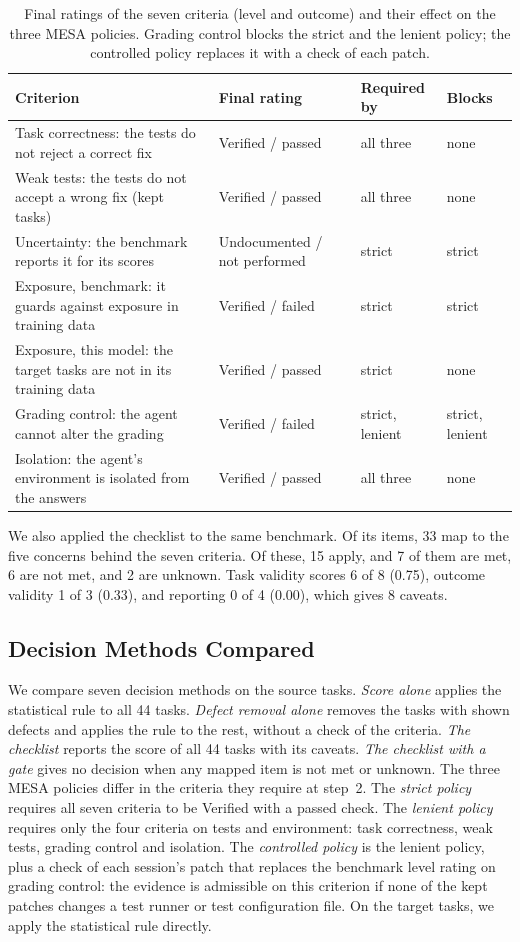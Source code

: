 \documentclass[runningheads]{llncs}
\begin{document}
\begin{table}[t]
\centering
\caption{Final ratings of the seven criteria (level and outcome) and their effect on the three MESA policies. Grading control blocks the strict and the lenient policy; the controlled policy replaces it with a check of each patch.}
\label{tab:ratings}
\footnotesize
\begin{tabularx}{\textwidth}{@{}YL{2.5cm}L{2.2cm}L{1.7cm}@{}}
\toprule
Criterion & Final rating & Required by & Blocks \\
\midrule
Task correctness: the tests do not reject a correct fix & Verified / passed & all three & none \\
Weak tests: the tests do not accept a wrong fix (kept tasks) & Verified / passed & all three & none \\
Uncertainty: the benchmark reports it for its scores & Undocumented / not performed & strict & strict \\
Exposure, benchmark: it guards against exposure in training data & Verified / failed & strict & strict \\
Exposure, this model: the target tasks are not in its training data & Verified / passed & strict & none \\
Grading control: the agent cannot alter the grading & Verified / failed & strict, lenient & strict, lenient \\
Isolation: the agent's environment is isolated from the answers & Verified / passed & all three & none \\
\bottomrule
\end{tabularx}
\end{table}

We also applied the checklist to the same benchmark. Of its items, 33 map to the five concerns behind the seven criteria. Of these, 15 apply, and 7 of them are met, 6 are not met, and 2 are unknown. Task validity scores 6 of 8 (0.75), outcome validity 1 of 3 (0.33), and reporting 0 of 4 (0.00), which gives 8 caveats.

\subsection{Decision Methods Compared}
We compare seven decision methods on the source tasks. \emph{Score alone} applies the statistical rule to all 44 tasks. \emph{Defect removal alone} removes the tasks with shown defects and applies the rule to the rest, without a check of the criteria. \emph{The checklist} reports the score of all 44 tasks with its caveats. \emph{The checklist with a gate} gives no decision when any mapped item is not met or unknown. The three MESA policies differ in the criteria they require at step~2. The \emph{strict policy} requires all seven criteria to be Verified with a passed check. The \emph{lenient policy} requires only the four criteria on tests and environment: task correctness, weak tests, grading control and isolation. The \emph{controlled policy} is the lenient policy, plus a check of each session's patch that replaces the benchmark level rating on grading control: the evidence is admissible on this criterion if none of the kept patches changes a test runner or test configuration file. On the target tasks, we apply the statistical rule directly.
\end{document}
